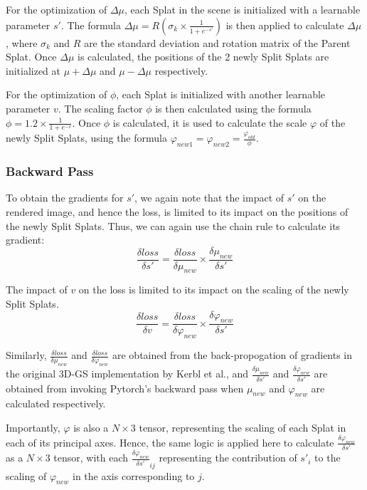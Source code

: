 \documentclass[11pt]{report}
\begin{document}
For the optimization of $\Delta \mu$, each Splat in the scene is initialized with a learnable parameter $s'$. The formula $\Delta \mu = R(\sigma_{k} \times \frac{1}{1 + e^{-s'}})$ is then applied to calculate $\Delta \mu$, where $\sigma_{k}$ and $R$ are the standard deviation and rotation matrix of the Parent Splat. Once $\Delta \mu$ is calculated, the positions of the 2 newly Split Splats are initialized at $\mu + \Delta \mu$ and $\mu - \Delta \mu$ respectively.

For the optimization of $\phi$, each Splat is initialized with another learnable parameter $v$. The scaling factor $\phi$ is then calculated using the formula $\phi = 1.2 \times \frac{1}{1 + e^{-v}}$. Once $\phi$ is calculated, it is used to calculate the scale $\varphi$ of the newly Split Splats, using the formula $\varphi_{new1} =  \varphi_{new2} = \frac{\varphi_{old}}{\phi}$.

\subsubsection{Backward Pass}
To obtain the gradients for $s'$, we again note that the impact of $s'$ on the rendered image, and hence the loss, is limited to its impact on the positions of the newly Split Splats. Thus, we can again use the chain rule to calculate its gradient:
\[ \frac{\delta loss}{\delta s'} = \frac{\delta loss}{\delta \mu_{new}} \times \frac{\delta \mu_{new}}{\delta s'} \]

The impact of $v$ on the loss is limited to its impact on the scaling of the newly Split Splats.
\[ \frac{\delta loss}{\delta v} = \frac{\delta loss}{\delta \varphi_{new}} \times \frac{\delta \varphi_{new}}{\delta s'} \]

Similarly, $\frac{\delta loss}{\delta \mu_{new}}$ and $\frac{\delta loss}{\delta \varphi_{new}}$ are obtained from the back-propogation of gradients in the original 3D-GS implementation by Kerbl et al., and $\frac{\delta \mu_{new}}{\delta s'}$ and $\frac{\delta \varphi_{new}}{\delta s'}$ are obtained from invoking Pytorch's backward pass when $\mu_{new}$ and $\varphi_{new}$ are calculated respectively.

Importantly, $\varphi$ is also a $N \times 3$ tensor, representing the scaling of each Splat in each of its principal axes. Hence, the same logic is applied here to calculate $\frac{\delta \varphi_{new}}{\delta s'}$ as a $N \times 3$ tensor, with each $\frac{\delta \varphi_{new}}{\delta s'}_{ij}$ representing the contribution of $s'_{i}$ to the scaling of $\varphi_{new}$ in the axis corresponding to $j$.
\end{document}
